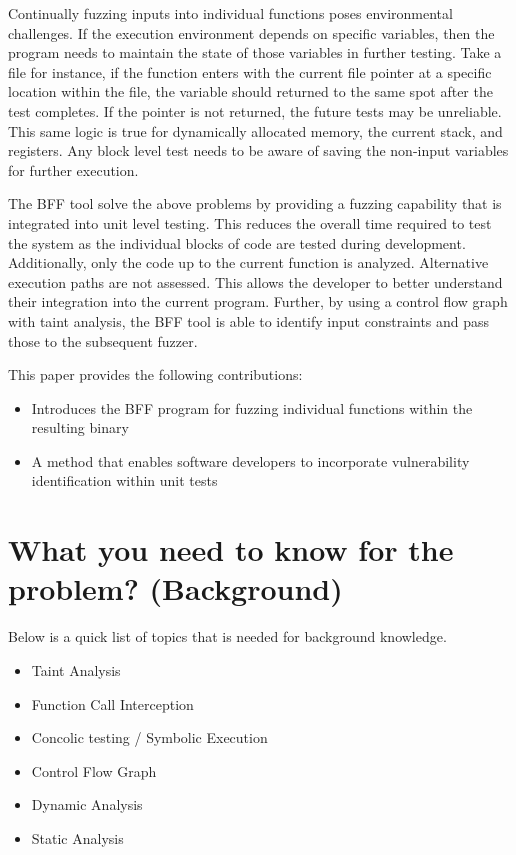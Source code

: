 \documentclass[conference]{IEEEtran}
\begin{document}
Continually fuzzing inputs into individual functions poses environmental challenges. If the execution environment depends on specific variables, then the program needs to maintain the state of those variables in further testing. Take a file for instance, if the function enters with the current file pointer at a specific location within the file, the variable should returned to the same spot after the test completes. If the pointer is not returned, the future tests may be unreliable. This same logic is true for dynamically allocated memory, the current stack, and registers. Any block level test needs to be aware of saving the non-input variables for further execution.

The BFF tool solve the above problems by providing a fuzzing capability that is integrated into unit level testing. This reduces the overall time required to test the system as the individual blocks of code are tested during development. Additionally, only the code up to the current function is analyzed. Alternative execution paths are not assessed. This allows the developer to better understand their integration into the current program. Further, by using a control flow graph with taint analysis, the BFF tool is able to identify input constraints and pass those to the subsequent fuzzer. 

This paper provides the following contributions:
\begin{itemize}
\item Introduces the BFF program for fuzzing individual functions within the resulting binary
\item A method that enables software developers to incorporate vulnerability identification within unit tests
\end{itemize}


\section{What you need to know for the problem? (Background)}
Below is a quick list of topics that is needed for background knowledge.

\begin{itemize}
\item Taint Analysis
\item Function Call Interception
\item Concolic testing / Symbolic Execution
\item Control Flow Graph
\item Dynamic Analysis
\item Static Analysis
\end{itemize}
\end{document}
